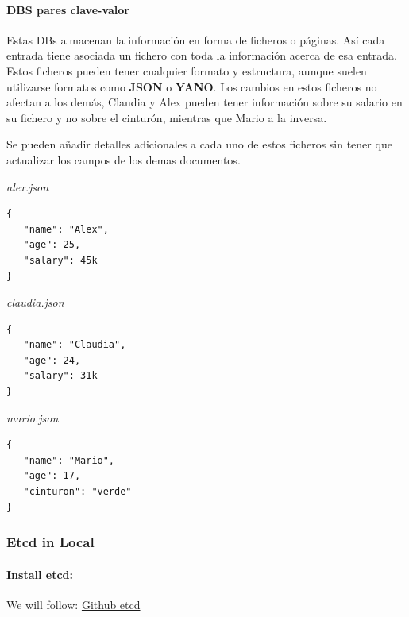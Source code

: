 \documentclass{article}
\newenvironment{codetemplate}[1][]{%
  \mybasecolorbox[#1]
  \itshape
}{%
  \endmybasecolorbox
}
\begin{document}
\paragraph{DBS pares clave-valor}

Estas DBs almacenan la información en forma de ficheros o páginas. Así cada entrada tiene asociada un fichero con toda la información acerca de esa entrada. Estos ficheros pueden tener cualquier formato y estructura, aunque suelen utilizarse formatos como \textbf{JSON} o \textbf{YANO}. Los cambios en estos ficheros no afectan a los demás, Claudia y Alex pueden tener información sobre su salario en su fichero y no sobre el cinturón, mientras que Mario a la inversa.

Se pueden añadir detalles adicionales a cada uno de estos ficheros sin tener que actualizar los campos de los demas documentos.

\begin{codetemplate}{alex.json}
\begin{verbatim}
{
   "name": "Alex",
   "age": 25,
   "salary": 45k
}
\end{verbatim}
\end{codetemplate}

\begin{codetemplate}{claudia.json}
\begin{verbatim}
{
   "name": "Claudia",
   "age": 24,
   "salary": 31k
}
\end{verbatim}
\end{codetemplate}

\begin{codetemplate}{mario.json}
\begin{verbatim}
{
   "name": "Mario",
   "age": 17,
   "cinturon": "verde"
}
\end{verbatim}
\end{codetemplate}

\subsubsection{Etcd in Local}

\paragraph{Install etcd:}

We will follow: \href{https://github.com/etcd-io/etcd/releases/}{Github etcd}
\end{document}
